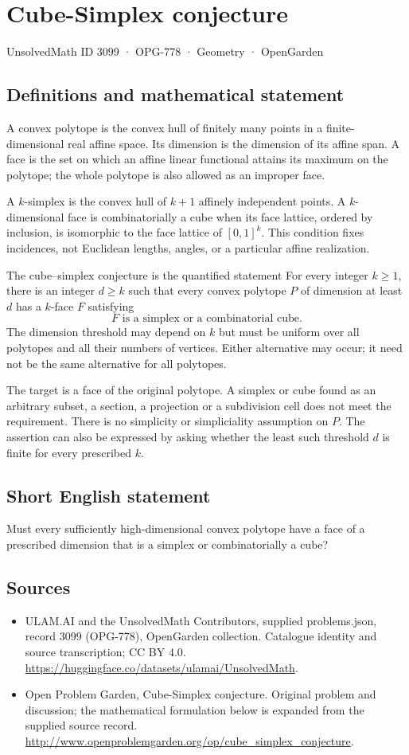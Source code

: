 \documentclass[11pt,a4paper]{article}
\begin{document}
\section*{Cube-Simplex conjecture}\label{3099}
{\small UnsolvedMath ID 3099 · OPG-778 · Geometry · OpenGarden}
\subsection{Definitions and mathematical statement}
A convex polytope is the convex hull of finitely many points in a
finite-dimensional real affine space. Its dimension is the dimension of
its affine span. A face is the set on which an affine linear functional
attains its maximum on the polytope; the whole polytope is also allowed
as an improper face.

A $k$-simplex is the convex hull of $k+1$ affinely independent points.
A $k$-dimensional face is combinatorially a cube when its face lattice,
ordered by inclusion, is isomorphic to the face lattice of $[0,1]^k$.
This condition fixes incidences, not Euclidean lengths, angles, or a
particular affine realization.

The cube--simplex conjecture is the quantified statement
For every integer $k\ge1$, there is an integer $d\ge k$ such that
 every convex polytope $P$ of dimension at least $d$ has a $k$-face $F$
 satisfying
\[
       F\text{ is a simplex or a combinatorial cube}.
\]
The dimension threshold may depend on $k$ but must be uniform over all
polytopes and all their numbers of vertices. Either alternative may occur;
it need not be the same alternative for all polytopes.

The target is a face of the original polytope. A simplex or cube found
as an arbitrary subset, a section, a projection or a subdivision cell
does not meet the requirement. There is no simplicity or simpliciality
assumption on $P$. The assertion can also be expressed by asking whether
the least such threshold $d$ is finite for every prescribed $k$.
\subsection{Short English statement}
Must every sufficiently high-dimensional convex polytope have a face of a prescribed dimension that is a simplex or combinatorially a cube?
\subsection{Sources}
\begin{itemize}
\item[S1] ULAM.AI and the UnsolvedMath Contributors, supplied problems.json, record 3099 (OPG-778), OpenGarden collection. Catalogue identity and source transcription; CC BY 4.0.
\url{https://huggingface.co/datasets/ulamai/UnsolvedMath}.
\item[S2] Open Problem Garden, Cube-Simplex conjecture. Original problem and discussion; the mathematical formulation below is expanded from the supplied source record.
\url{http://www.openproblemgarden.org/op/cube_simplex_conjecture}.
\end{itemize}
\end{document}
